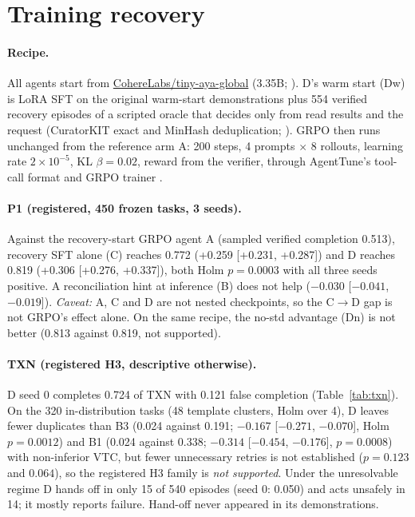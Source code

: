\documentclass[11pt]{article}
\begin{document}
\section{Training recovery}
\label{sec:train}

\paragraph{Recipe.} All agents start from \url{CohereLabs/tiny-aya-global} (3.35B; \citealp{salamanca2026tinyaya}).
D's warm start (Dw) is LoRA SFT on the original warm-start demonstrations plus 554 verified recovery episodes of a
scripted oracle that decides only from read results and the request (CuratorKIT exact and MinHash deduplication;
\citealp{bhattacharjee2026curatorkit}). GRPO \citep{shao2024deepseekmath} then runs unchanged from the reference arm A:
200 steps, 4 prompts $\times$ 8 rollouts, learning rate $2\times10^{-5}$, KL $\beta=0.02$, reward from the verifier,
through AgentTune's tool-call format and GRPO trainer \citep{lyngkhoi2026agenttune}.

\paragraph{P1 (registered, 450 frozen tasks, 3 seeds).} Against the recovery-start GRPO agent A (sampled verified
completion 0.513), recovery SFT alone (C) reaches 0.772 (+0.259 [+0.231, +0.287]) and D reaches 0.819 (+0.306 [+0.276,
+0.337]), both Holm $p=0.0003$ with all three seeds positive. A reconciliation hint at inference (B) does not help
($-0.030$ [$-0.041$, $-0.019$]). \emph{Caveat:} A, C and D are not nested checkpoints, so the C$\to$D gap is not GRPO's
effect alone. On the same recipe, the no-std advantage (Dn) is not better (0.813 against 0.819, not supported).

\paragraph{TXN (registered H3, descriptive otherwise).} D seed 0 completes 0.724 of TXN with 0.121 false completion
(Table~\ref{tab:txn}). On the 320 in-distribution tasks (48 template clusters, Holm over 4), D leaves fewer duplicates
than B3 (0.024 against 0.191; $-0.167$ [$-0.271$, $-0.070$], Holm $p=0.0012$) and B1 (0.024 against 0.338; $-0.314$
[$-0.454$, $-0.176$], $p=0.0008$) with non-inferior VTC, but fewer unnecessary retries is not established ($p=0.123$ and
$0.064$), so the registered H3 family is \emph{not supported}. Under the unresolvable regime D hands off in only 15 of
540 episodes (seed 0: 0.050) and acts unsafely in 14; it mostly reports failure. Hand-off never appeared in its
demonstrations.
\end{document}
